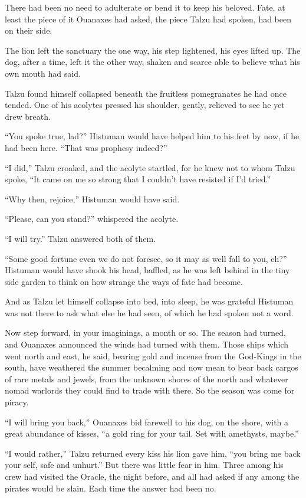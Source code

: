 There had been no need to adulterate or bend it to keep his beloved. Fate, at least the piece of it Ouanaxes had asked, the piece Talzu had spoken, had been on their side.

The lion left the sanctuary the one way, his step lightened, his eyes lifted up. The dog, after a time, left it the other way, shaken and scarce able to believe what his own mouth had said.

Talzu found himself collapsed beneath the fruitless pomegranates he had once tended. One of his acolytes pressed his shoulder, gently, relieved to see he yet drew breath.

``You spoke true, lad?'' Histuman would have helped him to his feet by now, if he had been here. ``That was prophesy indeed?''

``I did,'' Talzu croaked, and the acolyte startled, for he knew not to whom Talzu spoke, ``It came on me so strong that I couldn't have resisted if I'd tried.''

``Why then, rejoice,'' Histuman would have said.

``Please, can you stand?'' whispered the acolyte.

``I will try.'' Talzu answered both of them.

``Some good fortune even we do not foresee, so it may as well fall to you, eh?'' Histuman would have shook his head, baffled, as he was left behind in the tiny side garden to think on how strange the ways of fate had become.

And as Talzu let himself collapse into bed, into sleep, he was grateful Histuman was not there to ask what else he had seen, of which he had spoken not a word.

\secdiv

Now step forward, in your imaginings, a month or so. The season had turned, and Ouanaxes announced the winds had turned with them. Those ships which went north and east, he said, bearing gold and incense from the God-Kings in the south, have weathered the summer becalming and now mean to bear back cargos of rare metals and jewels, from the unknown shores of the north and whatever nomad warlords they could find to trade with there. So the season was come for piracy.

``I will bring you back,'' Ouanaxes bid farewell to his dog, on the shore, with a great abundance of kisses, ``a gold ring for your tail. Set with amethysts, maybe.''

``I would rather,'' Talzu returned every kiss his lion gave him, ``you bring me back your self, safe and unhurt.'' But there was little fear in him. Three among his crew had visited the Oracle, the night before, and all had asked if any among the pirates would be slain. Each time the answer had been no.

